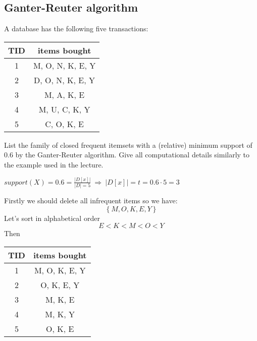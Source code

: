 \documentclass{article}
\begin{document}
  \subsection{Ganter-Reuter algorithm}
  \begin{centerframebox}
    A database has the following five transactions:

    \begin{center}
      \begin{tabular}{|c|c|}
        \hline
        TID & items bought \\ \hline
        1 & M, O, N, K, E, Y \\ \hline
        2 & D, O, N, K, E, Y \\ \hline
        3 & M, A, K, E \\ \hline
        4 & M, U, C, K, Y \\ \hline
        5 & C, O, K, E \\ \hline
      \end{tabular}
    \end{center}

    List the family of closed frequent itemsets with a (relative) minimum support of $0.6$ by the Ganter-Reuter algorithm.
    Give all computational details similarly to the example used in the lecture.
  \end{centerframebox}
  $support(X) = 0.6 = \frac{|D[x]|}{|D|=5}  ~\Longrightarrow~ |D[x]| = t =0.6 \cdot 5 = 3$

  Firstly we should delete all infrequent items so we have:
  \[ \left\{ {M, O, K, E, Y} \right\} \]
  Let's sort in alphabetical order
  \[ E < K < M < O < Y \]
  Then
  \begin{center}
    \begin{tabular}{|c|c|}
      \hline
      TID & items bought \\ \hline
      1 & M, O, K, E, Y \\ \hline
      2 & O, K, E, Y \\ \hline
      3 & M, K, E \\ \hline
      4 & M, K, Y \\ \hline
      5 & O, K, E \\ \hline
    \end{tabular}
  \end{center}
\end{document}
